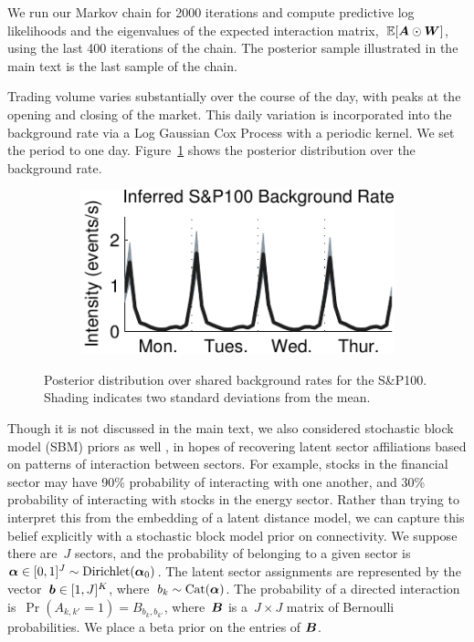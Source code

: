 We run our Markov chain for 2000 iterations and compute predictive log likelihoods and the eigenvalues of the expected interaction matrix,~${\mathbb{E}[\boldsymbol{A}\odot\boldsymbol{W}]}$, using the last 400 iterations of the chain. The posterior sample illustrated in the main text is the last sample of the chain.

Trading volume varies substantially over the course of the day, with peaks at the opening and closing of the market. This daily variation is incorporated into the background rate via a Log Gaussian Cox Process with a periodic kernel. We set the period to one day. Figure~\ref{fig:financial_bkgd} shows the posterior distribution over the background rate.

\begin{figure}[!h]
\begin{subfigure}[T]{\linewidth}
\begin{center}
\includegraphics[width=.6\linewidth]{figures/ch2/financial_bkgd}
\end{center}
\end{subfigure}
\caption{Posterior distribution over shared background rates for the S\&P100. Shading indicates two standard deviations from the mean.}
\label{fig:financial_bkgd}
\end{figure}

Though it is not discussed in the main text, we also considered stochastic block model (SBM) priors as well \cite{Hoff-2008}, in hopes of recovering latent sector affiliations based on patterns of interaction between sectors. For example, stocks in the financial sector may have 90\% probability of interacting with one another, and 30\% probability of interacting with stocks in the energy sector. Rather than trying to interpret this from the embedding of a latent distance model, we can capture this belief explicitly with a stochastic block model prior on connectivity. We suppose there are~$J$ sectors, and the probability of belonging to a given sector is~${\boldsymbol{\alpha} \in [0,1]^J\sim\text{Dirichlet}(\boldsymbol{\alpha}_0)}$. The latent sector assignments are represented by the vector~${\boldsymbol{b}\in [1,J]^K}$, where~${b_k\sim\text{Cat}(\boldsymbol{\alpha})}$. The probability of a directed interaction is~${\Pr(A_{k,k'}=1)=B_{b_{k},b_{k'}}}$, where~$\boldsymbol{B}$ is a~${J\times J}$ matrix of Bernoulli probabilities. We place a beta prior on the entries of $\boldsymbol{B}$. 

